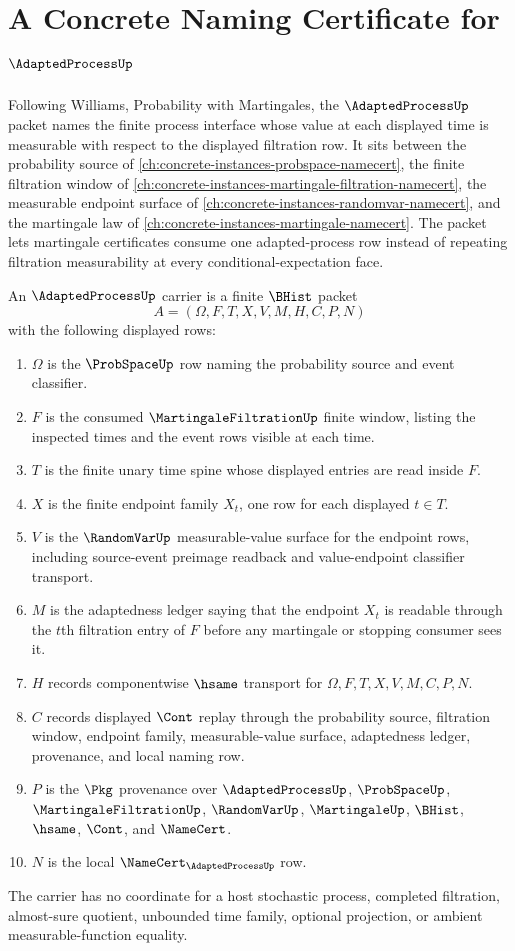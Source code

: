 \chapter{A Concrete Naming Certificate for $\AdaptedProcessUp$}
\label{ch:concrete-instances-adapted-process-namecert}

Following Williams, Probability with Martingales, the $\AdaptedProcessUp$ packet names the finite process interface whose value at each displayed time is measurable with respect to the displayed filtration row. It sits between the probability source of \autoref{ch:concrete-instances-probspace-namecert}, the finite filtration window of \autoref{ch:concrete-instances-martingale-filtration-namecert}, the measurable endpoint surface of \autoref{ch:concrete-instances-randomvar-namecert}, and the martingale law of \autoref{ch:concrete-instances-martingale-namecert}. The packet lets martingale certificates consume one adapted-process row instead of repeating filtration measurability at every conditional-expectation face.

\begin{definition}
\label{def:adapted-process-carrier}
An $\AdaptedProcessUp$ carrier is a finite $\BHist$ packet
$$
A=(\Omega,F,T,X,V,M,H,C,P,N)
$$
with the following displayed rows:
\begin{enumerate}
\item $\Omega$ is the $\ProbSpaceUp$ row naming the probability source and event classifier.
\item $F$ is the consumed $\MartingaleFiltrationUp$ finite window, listing the inspected times and the event rows visible at each time.
\item $T$ is the finite unary time spine whose displayed entries are read inside $F$.
\item $X$ is the finite endpoint family $X_t$, one row for each displayed $t\in T$.
\item $V$ is the $\RandomVarUp$ measurable-value surface for the endpoint rows, including source-event preimage readback and value-endpoint classifier transport.
\item $M$ is the adaptedness ledger saying that the endpoint $X_t$ is readable through the $t$th filtration entry of $F$ before any martingale or stopping consumer sees it.
\item $H$ records componentwise $\hsame$ transport for $\Omega,F,T,X,V,M,C,P,N$.
\item $C$ records displayed $\Cont$ replay through the probability source, filtration window, endpoint family, measurable-value surface, adaptedness ledger, provenance, and local naming row.
\item $P$ is the $\Pkg$ provenance over $\AdaptedProcessUp$, $\ProbSpaceUp$, $\MartingaleFiltrationUp$, $\RandomVarUp$, $\MartingaleUp$, $\BHist$, $\hsame$, $\Cont$, and $\NameCert$.
\item $N$ is the local $\NameCert_{\AdaptedProcessUp}$ row.
\end{enumerate}
The carrier has no coordinate for a host stochastic process, completed filtration, almost-sure quotient, unbounded time family, optional projection, or ambient measurable-function equality.
\end{definition}

